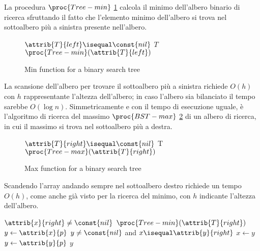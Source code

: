 La procedura $\proc{Tree-min}$ \ref{alg:minTreeSearch} calcola il minimo dell'albero binario di ricerca sfruttando
il fatto che l'elemento minimo dell'albero si trova nel sottoalbero più a sinistra presente nell'albero.

\begin{figure}
    \caption{Min function for a binary search tree}
    \label{alg:minTreeSearch}
    \begin{codebox}
        \li \If $\attrib{T}{left} \isequal \const{nil}$
            \Then
        \li                       \Return $T$
        \li \Else \Return $\proc{Tree-min}(\attrib{T}{left})$
    \end{codebox}
\end{figure}
La scansione dell'albero per trovare il sottoalbero più a sinistra richiede $O(h)$ con $h$ rappresentante l'altezza  dell'albero;
in caso l'albero sia bilanciato il tempo sarebbe $O(\log n)$.\newline
Simmetricamente e con il tempo di esecuzione uguale, è l'algoritmo di ricerca del massimo $\proc{BST-max}$ \ref{alg:maxTreeSearch} di un
albero di ricerca, in cui il massimo si trova nel sottoalbero più a destra.

\begin{figure}
    \caption{Max function for a binary search tree}
    \label{alg:maxTreeSearch}
    \begin{codebox}
        \li \If $\attrib{T}{right} \isequal \const{nil}$
            \Then
        \li                        \Return T
        \li \Else \Return $\proc{Tree-max}(\attrib{T}{right})$
    \end{codebox}
\end{figure}
Scandendo l'array andando sempre nel sottoalbero destro richiede un tempo $O(h)$, come anche già visto per la ricerca del minimo, con $h$ indicante l'altezza dell'albero.


\begin{codebox}
\li \If $\attrib{x}{right} \neq \const{nil}$
    \Then
\li             \Return $\proc{Tree-min}(\attrib{T}{right})$
\li $y \gets \attrib{x}{p}$
\li \While $y \neq \const{nil}$ and $x \isequal \attrib{y}{right}$
    \Do
\li                $x \gets y$
\li                $y \gets \attrib{y}{p}$
    \End
\Return $y$
\end{codebox}


